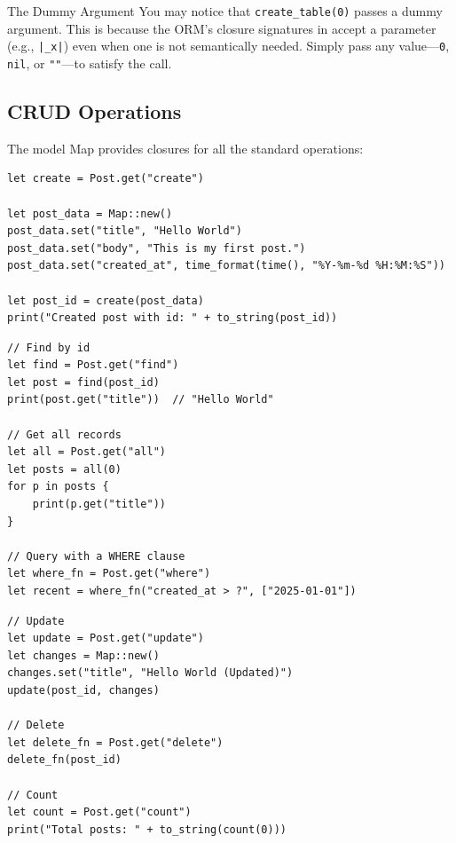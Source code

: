 \begin{notebox}{The Dummy Argument}
You may notice that \lstinline|create_table(0)| passes a dummy argument.
This is because the ORM's closure signatures in  accept a parameter (e.g., \lstinline{|_x|}) even when one is not semantically needed.
Simply pass any value---\lstinline|0|, \lstinline|nil|, or \lstinline|""|---to satisfy the call.
\end{notebox}

\subsection{CRUD Operations}\label{sec:orm-crud}


The model Map provides closures for all the standard operations:

\begin{lstlisting}[language=Lattice, caption={Creating records}]
let create = Post.get("create")

let post_data = Map::new()
post_data.set("title", "Hello World")
post_data.set("body", "This is my first post.")
post_data.set("created_at", time_format(time(), "%Y-%m-%d %H:%M:%S"))

let post_id = create(post_data)
print("Created post with id: " + to_string(post_id))
\end{lstlisting}

\begin{lstlisting}[language=Lattice, caption={Reading records}]
// Find by id
let find = Post.get("find")
let post = find(post_id)
print(post.get("title"))  // "Hello World"

// Get all records
let all = Post.get("all")
let posts = all(0)
for p in posts {
    print(p.get("title"))
}

// Query with a WHERE clause
let where_fn = Post.get("where")
let recent = where_fn("created_at > ?", ["2025-01-01"])
\end{lstlisting}

\begin{lstlisting}[language=Lattice, caption={Updating and deleting records}]
// Update
let update = Post.get("update")
let changes = Map::new()
changes.set("title", "Hello World (Updated)")
update(post_id, changes)

// Delete
let delete_fn = Post.get("delete")
delete_fn(post_id)

// Count
let count = Post.get("count")
print("Total posts: " + to_string(count(0)))
\end{lstlisting}

